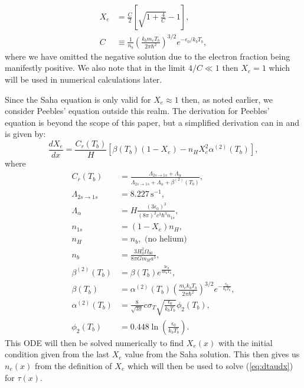 \documentclass[%
reprint,
 amsmath,amssymb,
 aps,
]{revtex4-2}
\begin{document}
\begin{align}
	X_e&=\frac{C}{2}\left[\sqrt{1+\frac{4}{C}}-1 \right],\label{eq:Saha}\\ 
	C&\equiv\frac{1}{n_b}\left(\frac{k_bm_eT_b}{2\pi\hbar^2}\right)^{3/2}e^{-\epsilon_0/k_bT_b},\label{eq:C}
\end{align}
where we have omitted the negative solution due to the electron fraction being manifestly positive. We also note that in the limit $4/C\ll1$ then $X_e=1$ which will be used in numerical calculations later.

Since the Saha equation is only valid for $X_e\approx1$ then, as noted earlier, we consider Peebles' equation outside this realm. The derivation for Peebles' equation is beyond the scope of this paper, but a simplified derivation can in \cite{Dodelson:2003ft} and is given by:
\begin{equation}
	\frac{dX_e}{dx}=\frac{C_r(T_b)}{H}\left[\beta(T_b)(1-X_e)-n_HX_e^2\alpha^{(2)}(T_b)\right],\label{eq:Peebles}
\end{equation}
where
\begin{align*}
	C_r(T_b)&= \frac{\Lambda_{2s\rightarrow1s} +\Lambda_{\alpha}}{\Lambda_{2s\rightarrow1s} + \Lambda_{\alpha} +\beta^{(2)}(T_b)}, \\
	\Lambda_{2s\rightarrow1s}&= 8.227\,\text{s}^{-1},\\
	\Lambda_{\alpha}&= H\frac{(3\epsilon_0)^3}{(8\pi)^2 c^3\hbar^3 n_{1s}}, \\
	n_{1s}&= (1-X_e)n_H,\\
	n_H &= n_b, \,\,\text{(no helium)}\\
	n_b &= \frac{3H_0^2 \Omega_{b0}}{8\pi G m_H a^3},\\
	\beta^{(2)}(T_b) &= \beta(T_b) e^{\frac{3\epsilon_0}{4k_bT_b}},\\
	\beta(T_b) &= \alpha^{(2)}(T_b) \left(\frac{m_ek_bT_b}{2\pi \hbar^2}\right)^{3/2} e^{-\frac{\epsilon_0}{k_bT_b}},\\
	\alpha^{(2)}(T_b)&= \frac{8}{\sqrt{3\pi}}	c\sigma_T\sqrt{\frac{\epsilon_0}{k_bT_b}}\phi_2(T_b),\\
	\phi_2(T_b)&= 0.448\ln\left(\frac{\epsilon_0}{k_bT_b}\right).
\end{align*}
This ODE will then be solved numerically to find $X_e(x)$ with the initial condition given from the last $X_e$ value from the Saha solution. This then gives us $n_e(x)$ from the definition of $X_e$ which will then be used to solve (\ref{eq:dtaudx}) for $\tau(x)$.
\end{document}
